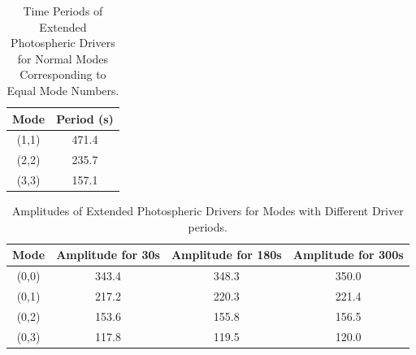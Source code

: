 \documentclass[final,1p]{elsarticle}
\begin{document}
\begin{table}\label{simcperiods}
\centering
\begin{tabular}{c c }
\hline
Mode   &  Period (s) \\
\hline
(1,1) & 471.4  \\
\hline
(2,2) & 235.7   \\
\hline
(3,3) & 157.1   \\
\hline

\end{tabular} 
\caption{Time Periods of Extended Photospheric Drivers for Normal Modes Corresponding to Equal Mode Numbers.}
\end{table}









\begin{table}\label{simamps}
\centering
\begin{tabular}{c c c c }
\hline
Mode   &  Amplitude for 30s &  Amplitude for 180s &  Amplitude for 300s\\
\hline
(0,0) & 343.4 & 348.3 & 350.0 \\
\hline
(0,1) & 217.2 & 220.3 & 221.4 \\
\hline
(0,2) & 153.6 & 155.8 & 156.5 \\
\hline
(0,3) & 117.8 & 119.5 & 120.0 \\
\hline
\end{tabular} 
\caption{Amplitudes of Extended Photospheric Drivers for Modes with Different Driver periods.}
\end{table}
















 



\end{document}
